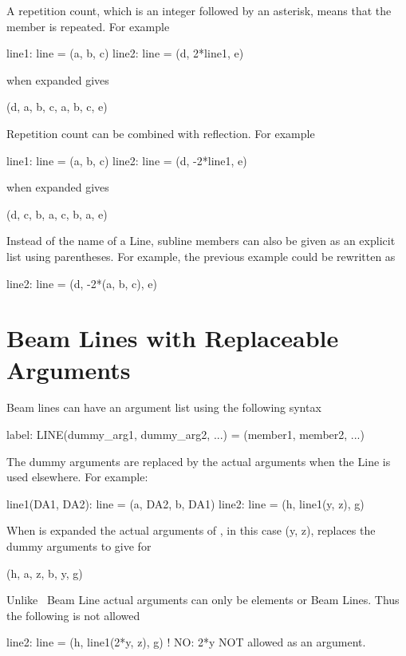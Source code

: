 A repetition count, which is an integer followed by an asterisk, 
means that the member is
repeated. For example
\begin{example}
  line1: line = (a, b, c)
  line2: line = (d, 2*line1, e)
\end{example}
 when expanded gives
\begin{example}
  (d, a, b, c, a, b, c, e)
\end{example}
Repetition count can be combined with reflection. For example
\begin{example}
  line1: line = (a, b, c)
  line2: line = (d, -2*line1, e)
\end{example}
 when expanded gives
\begin{example}
  (d, c, b, a, c, b, a, e)
\end{example}
Instead of the name of a Line, subline members can also be given as an explicit 
list using parentheses. For example, the previous example could be rewritten as
\begin{example}
  line2: line = (d, -2*(a, b, c), e)
\end{example}

\section{Beam Lines with Replaceable Arguments}

Beam lines can have an argument list using the following syntax
\begin{example}
  label: LINE(dummy_arg1, dummy_arg2, ...) = (member1, member2, ...)
\end{example}
The dummy arguments are replaced by the actual arguments when the Line is used
elsewhere. For example:
\begin{example}
  line1(DA1, DA2): line = (a, DA2, b, DA1)
  line2: line = (h, line1(y, z), g)
\end{example}
When  is expanded the actual arguments of , in this
case \vn(y, z), replaces the dummy arguments  to give for
\begin{example}
  (h, a, z, b, y, g)
\end{example} 
Unlike \mad\, Beam Line actual arguments can only be elements or Beam Lines. 
Thus the following is not allowed
\begin{example}
  line2: line = (h, line1(2*y, z), g)   ! NO: 2*y NOT allowed as an argument.
\end{example}

